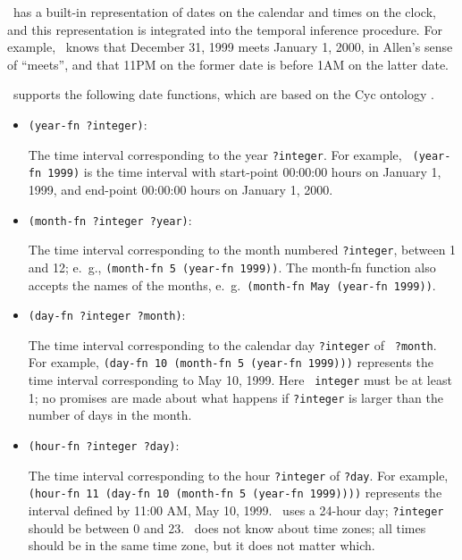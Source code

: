 \Snark\  has a built-in representation of dates on the calendar and times on
the clock, and this representation is integrated into the temporal inference
procedure.  For example, \snark\  knows that December 31, 1999 meets January
1, 2000, in Allen's sense of ``meets'', and that 11PM on the former date is
before 1AM on the latter date.


\Snark\  supports the following date
functions, which are based on the Cyc ontology \cite{cyc-ul}.
\begin{itemize}

 \item{\verb'(year-fn ?integer)':}

The time interval corresponding to the year {\tt ?integer}.  For example, {\tt
(year-fn 1999)} is the time interval with start-point 00:00:00 hours on
January 1, 1999, and end-point 00:00:00 hours on January 1, 2000.


 \item{\verb'(month-fn ?integer ?year)':}

The time interval corresponding to the month numbered {\tt ?integer}, between
1 and 12; e.\ g., {\tt (month-fn 5 (year-fn 1999))}.  The month-fn function
also accepts the names of the months, e.\ g.\, {\tt (month-fn May (year-fn
1999))}.

 \item{\verb'(day-fn ?integer ?month)':}

The time interval corresponding to the calendar day {\tt ?integer} of {\tt
?month}.  For example, {\tt (day-fn 10 (month-fn 5 (year-fn 1999)))}
represents the time interval corresponding to May 10, 1999. Here {\tt
integer} must be at least 1; no promises are
made about what happens if {\tt ?integer} is larger than the number of days in
the month.

 \item{\verb'(hour-fn ?integer ?day)':}

The time interval corresponding to the hour {\tt ?integer} of {\tt ?day}.
For example, {\tt (hour-fn 11 (day-fn 10 (month-fn 5 (year-fn 1999))))}
represents the interval defined by 11:00 AM, May 10, 1999.  \Snark\  uses a
24-hour day; {\tt ?integer} should be between 0 and 23.  \Snark\  does not know
about time zones; all times should be in the same time zone, but it does not
matter which.



\end{itemize}
